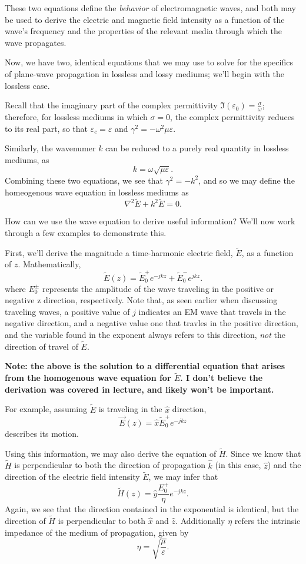 \documentclass{article}
\begin{document}
These two equations define the \textit{behavior} of electromagnetic waves, and both may be used to derive the electric and magnetic field intensity as a function of the wave's frequency and the properties of the relevant media through which the wave propagates.

Now, we have two, identical equations that we may use to solve for the specifics of plane-wave propagation in lossless and lossy mediums; we'll begin with the lossless case. 

Recall that the imaginary part of the complex permittivity \(\Im{(\varepsilon_0)} = \frac{\sigma}{\omega}\); therefore, for lossless mediums in which \(\sigma = 0\), the complex permittivity reduces to its real part, so that \(\varepsilon_c = \varepsilon\) and \(\gamma^2 = -\omega^2\mu\varepsilon\).

Similarly, the wavenumer \(k\) can be reduced to a purely real quantity in lossless mediums, as
\[
  k = \omega \sqrt{\mu\varepsilon}.
\]
Combining these two equations, we see that \(\gamma^2 = -k^2\), and so we may define the homeogenous wave equation in lossless mediums as
\[
	\nabla^2 \widetilde{E} + k^2\widetilde{E} = 0.
\]

How can we use the wave equation to derive useful information? We'll now work through a few examples to demonstrate this.

First, we'll derive the magnitude a time-harmonic electric field, \(\widetilde{E}\), as a function of \(z\). Mathematically,
\[
	\widetilde{E}(z) = \widetilde{E}_0^+e^{-jkz} + \widetilde{E}^-_0e^{jkz}.
\]
where \(E_0^\pm\) represents the amplitude of the wave traveling in the positive or negative z direction, respectively. Note that, as seen earlier when discussing traveling waves, a positive value of \(j\) indicates an EM wave that travels in the negative direction, and a negative value one that travles in the positive direction, and the variable found in the exponent always refers to this direction, \textit{not} the direction of travel of \(\widetilde{E}\).

\textbf{Note: the above is the solution to a differential equation that arises from the homogenous wave equation for \(\widetilde{E}\). I don't believe the derivation was covered in lecture, and likely won't be important.}

For example, assuming \(\widetilde{E}\) is traveling in the \(\hat{x}\) direction, 
\[
	\vec{E}(z) = \hat{x}\widetilde{E}_0^+e^{-jkz}
\]
describes its motion.

Using this information, we may also derive the equation of \(\widetilde{H}\). Since we know that \(\widetilde{H}\) is perpendicular to both the direction of propagation \(\hat{k}\) (in this case, \(\hat{z}\)) and the direction of the electric field intensity \(\widetilde{E}\), we may infer that
\[
	\widetilde{H}(z) = \hat{y}\frac{E_0^+}{\eta}e^{-jkz}.
\]
Again, we see that the direction contained in the exponential is identical, but the direction of \(\widetilde{H}\) is perpendicular to both \(\hat{x}\) and \(\hat{z}\). Additionally \(\eta\) refers the intrinsic impedance of the medium of propagation, given by 
\[
  \eta = \sqrt{\frac{\mu}{\varepsilon}}.
\]
\end{document}
